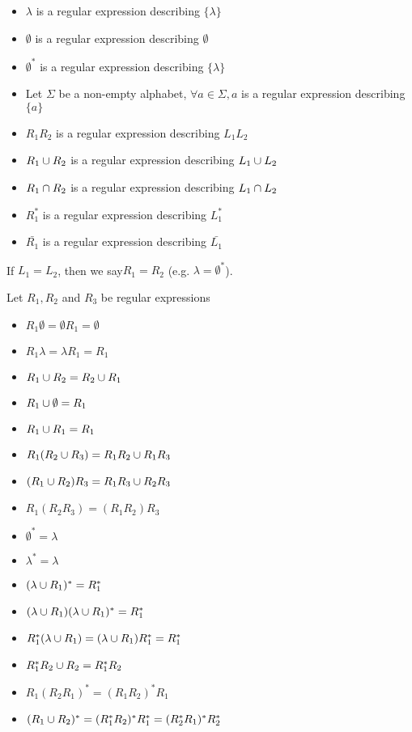 \documentclass{article}
\newcommand{\emptyString}{\lambda}
\begin{document}
\begin{itemize}
    \item \(\emptyString\) is a regular expression describing  \(\{\emptyString\}\)
    \item \(\emptyset\) is a regular expression describing \(\emptyset\)
    \item \(\emptyset^*\) is a regular expression describing \(\{\emptyString\}\)
    \item Let \(\Sigma\) be a non-empty alphabet, \(\forall a \in \Sigma, a\) is a regular expression describing \(\{a\}\)
    \item \(R_1R_2\) is a regular expression describing \(L_1L_2\)
    \item \(R_1\cup R_2\) is a regular expression describing \(L_1\cup L_2\)
    \item \(R_1\cap R_2\) is a regular expression describing \(L_1\cap L_2\)
    \item \(R_1^*\) is a regular expression describing \(L_1^*\)
    \item \(\bar{R_1}\) is a regular expression describing \(\bar{L_1}\)
\end{itemize}
If \(L_1 = L_2\), then we say\(R_1 = R_2\) (e.g. \(\emptyString = \emptyset^*\)).

Let \(R_1, R_2\) and \(R_3\) be regular expressions
\begin{itemize}
    \item \(R_1 \emptyset = \emptyset R_1 = \emptyset\)
    \item \(R_1 \emptyString = \emptyString R_1 = R_1\)
    \item \(R_1 \cup R_2 = R_2 \cup R_1\)
    \item \(R_1 \cup \emptyset = R_1\)
    \item \(R_1 \cup R_1 = R_1\)
    \item \(R_1(R_2 \cup R_3) = R_1R_2 \cup R_1R_3\)
    \item \((R_1 \cup R_2)R_3 = R_1R_3 \cup R_2R_3\)
    \item \(R_1(R_2R_3) = (R_1R_2)R_3\)
    \item \(\emptyset^*=\emptyString\)
    \item \(\emptyString^*=\emptyString\)
    \item \((\emptyString \union R_1)^* = R_1^*\)
    \item \((\emptyString \union R_1)(\emptyString \union R_1)^* = R_1^*\)
    \item \(R_1^*(\emptyString \union R_1)=(\emptyString \union R_1)R_1^* = R_1^*\)
    \item \(R_1^*R_2 \cup R_2 = R_1^*R_2\)
    \item \(R_1(R_2R_1)^*=(R_1R_2)^*R_1\)
    \item \((R_1 \cup R_2)^* = (R_1^*R_2)^*R_1^* = (R_2^*R_1)^*R_2^*\)
\end{itemize}
\end{document}
